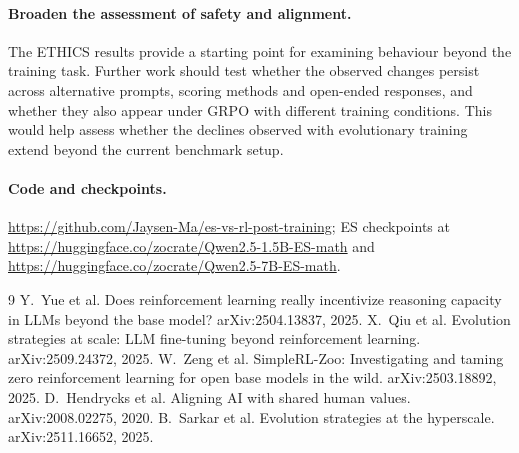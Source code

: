 \documentclass[10pt]{article}
\begin{document}
\paragraph{Broaden the assessment of safety and alignment.} The ETHICS results provide a starting point for examining behaviour beyond the training task. Further work should test whether the observed changes persist across alternative prompts, scoring methods and open-ended responses, and whether they also appear under GRPO with different training conditions. This would help assess whether the declines observed with evolutionary training extend beyond the current benchmark setup.

\paragraph{Code and checkpoints.} \url{https://github.com/Jaysen-Ma/es-vs-rl-post-training}; ES checkpoints at \url{https://huggingface.co/zocrate/Qwen2.5-1.5B-ES-math} and \url{https://huggingface.co/zocrate/Qwen2.5-7B-ES-math}.

\begin{thebibliography}{9}
 Y.~Yue et al. Does reinforcement learning really incentivize reasoning capacity in LLMs beyond the base model? arXiv:2504.13837, 2025.
 X.~Qiu et al. Evolution strategies at scale: LLM fine-tuning beyond reinforcement learning. arXiv:2509.24372, 2025.
 W.~Zeng et al. SimpleRL-Zoo: Investigating and taming zero reinforcement learning for open base models in the wild. arXiv:2503.18892, 2025.
 D.~Hendrycks et al. Aligning AI with shared human values. arXiv:2008.02275, 2020.
 B.~Sarkar et al. Evolution strategies at the hyperscale. arXiv:2511.16652, 2025.
\end{thebibliography}
\end{document}
